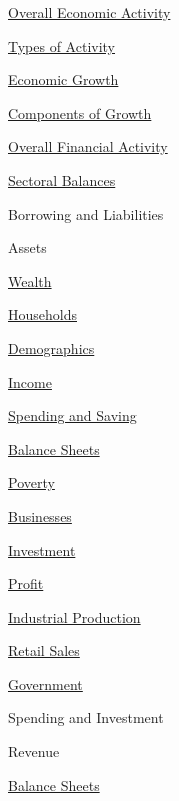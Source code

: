 \documentclass{report}
\begin{document}
\begin{minipage}{0.4\textwidth}
\begin{description}
\item {\hyperlink{oea}{Overall Economic Activity}}
\begin{description}
\item {\hyperlink{oety}{Types of Activity}}
\item {\hyperlink{oegr}{Economic Growth}}
\item {\hyperlink{oegc}{Components of Growth}}
\end{description}
\item {\hyperlink{ofa}{Overall Financial Activity}}
\begin{description}
\item {\hyperlink{ofsb}{Sectoral Balances}}
\item Borrowing and Liabilities
\item Assets
\item {\hyperlink{ofw}{Wealth}}
\end{description}
\item {\hyperlink{hh}{Households}}
\begin{description}
\item {\hyperlink{hhdem}{Demographics}}
\item {\hyperlink{hhinc}{Income}}
\item {\hyperlink{hhss}{Spending and Saving}}
\item {\hyperlink{hhbs}{Balance Sheets}}
\item {\hyperlink{hhpov}{Poverty}}
\end{description}
\item {\hyperlink{bus}{Businesses}}
\begin{description}
\item {\hyperlink{busin}{Investment}}
\item {\hyperlink{buspr}{Profit}}
\item {\hyperlink{busip}{Industrial Production}}
\item {\hyperlink{busrs}{Retail Sales}}
\end{description}
\item {\hyperlink{gov}{Government}}
\begin{description}
\item Spending and Investment
\item Revenue
\item {\hyperlink{govbs}{Balance Sheets}}
\end{description}
\end{description}
\end{minipage} \hspace{10mm} 
\end{document}
